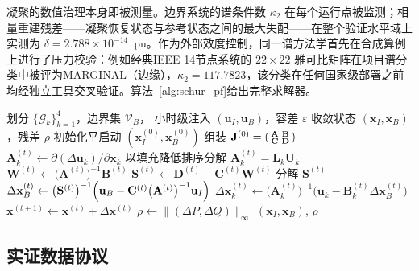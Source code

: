 凝聚的数值治理本身即被测量。边界系统的谱条件数 $\kappa_2$ 在每个运行点被监测\cite{vancutsem1998}；相量重建残差——凝聚恢复状态与参考状态之间的最大失配——在整个验证水平域上实测为 $\delta = 2.788 \times 10^{-14}$~pu。作为外部效度控制，同一谱方法学首先在合成算例上进行了压力校验：例如经典IEEE 14节点系统的 $22\times22$ 雅可比矩阵在项目谱分类中被评为MARGINAL（边缘），$\kappa_2 = 117.7823$，该分类在任何国家级部署之前均经独立工具交叉验证。算法~\ref{alg:schur_pf}给出完整求解器。

\begin{algorithm}[!t]
\caption{SENI-142 HBCF划分上的边界-舒尔交流潮流}
\label{alg:schur_pf}
\begin{algorithmic}[1]
\Require 划分 $\{\mathcal{G}_k\}_{k=1}^{4}$，边界集 $\mathcal{V}_B$，
         小时级注入 $(\mathbf{u}_I, \mathbf{u}_B)$，容差 $\varepsilon$
\Ensure 收敛状态 $(\mathbf{x}_I, \mathbf{x}_B)$，残差 $\rho$
\State 初始化平启动 $(\mathbf{x}_I^{(0)}, \mathbf{x}_B^{(0)})$
\State 组装 $\mathbf{J}^{(0)} = \begin{psmallmatrix} \mathbf{A} & \mathbf{B} \\ \mathbf{C} & \mathbf{D} \end{psmallmatrix}$
   
     \State $\mathbf{A}_k^{(t)} \gets \partial (\Delta \mathbf{u}_k) / \partial \mathbf{x}_k$
     \State 以填充降低排序分解 $\mathbf{A}_k^{(t)} = \mathbf{L}_k \mathbf{U}_k$
  \EndFor
  \State $\mathbf{W}^{(t)} \gets \bigl(\mathbf{A}^{(t)}\bigr)^{-1} \mathbf{B}^{(t)}$ 
  \State $\mathbf{S}^{(t)} \gets \mathbf{D}^{(t)} - \mathbf{C}^{(t)} \mathbf{W}^{(t)}$
  \State 分解 $\mathbf{S}^{(t)}$
  \State $\Delta \mathbf{x}_B^{(t)} \gets \bigl(\mathbf{S}^{(t)}\bigr)^{-1} \Bigl( \mathbf{u}_B - \mathbf{C}^{(t)} \bigl(\mathbf{A}^{(t)}\bigr)^{-1} \mathbf{u}_I \Bigr)$
   
     \State $\Delta \mathbf{x}_k^{(t)} \gets \bigl(\mathbf{A}_k^{(t)}\bigr)^{-1} \bigl( \mathbf{u}_k - \mathbf{B}_k^{(t)} \Delta \mathbf{x}_B^{(t)} \bigr)$
  \EndFor
  \State $\mathbf{x}^{(t+1)} \gets \mathbf{x}^{(t)} + \Delta \mathbf{x}^{(t)}$
  \State $\rho \gets \lVert (\Delta P, \Delta Q) \rVert_{\infty}$
\EndFor
\State \Return $(\mathbf{x}_I, \mathbf{x}_B)$, $\rho$ 
\end{algorithmic}
\end{algorithm}

\subsection{实证数据协议}
\label{sub:dataprotocol}


